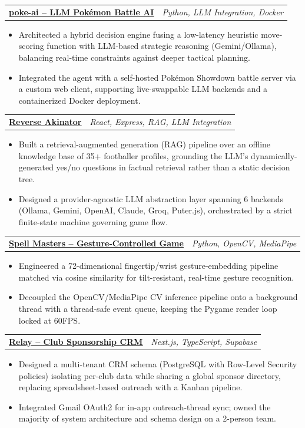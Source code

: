 \documentclass[letterpaper,11pt]{article}
\makeatletter
\newcommand{\resumeItem}[1]{
  \item\small{
    {#1 \vspace{-2pt}}
  }
}
\newcommand{\resumeProjectHeading}[2]{
    \item
    \begin{minipage}[t]{0.97\textwidth}
    \begin{tabular*}{\linewidth}{l@{\extracolsep{\fill}}r}
      \small#1 & #2 \\
    \end{tabular*}\vspace{-7pt}
}
\newcommand{\resumeItemListStart}{\begin{itemize}}
\newcommand{\resumeItemListEnd}{\end{itemize}\vspace{-5pt}\end{minipage}}
\makeatother
\begin{document}
      \resumeProjectHeading
          {\textbf{\href{https://github.com/micvitc/Club-Expo-AIvsChampions}{\underline{poke-ai -- LLM Pok\'emon Battle AI}}}}{\emph{Python, LLM Integration, Docker}}
          \resumeItemListStart
            \resumeItem{Architected a hybrid decision engine fusing a low-latency heuristic move-scoring function with LLM-based strategic reasoning (Gemini/Ollama), balancing real-time constraints against deeper tactical planning.}
            \resumeItem{Integrated the agent with a self-hosted Pok\'emon Showdown battle server via a custom web client, supporting live-swappable LLM backends and a containerized Docker deployment.}
          \resumeItemListEnd

      \resumeProjectHeading
          {\textbf{\href{https://github.com/Anasarfeen123/reverse-akinator}{\underline{Reverse Akinator}}}}{\emph{React, Express, RAG, LLM Integration}}
          \resumeItemListStart
            \resumeItem{Built a retrieval-augmented generation (RAG) pipeline over an offline knowledge base of 35+ footballer profiles, grounding the LLM's dynamically-generated yes/no questions in factual retrieval rather than a static decision tree.}
            \resumeItem{Designed a provider-agnostic LLM abstraction layer spanning 6 backends (Ollama, Gemini, OpenAI, Claude, Groq, Puter.js), orchestrated by a strict finite-state machine governing game flow.}
          \resumeItemListEnd

      \resumeProjectHeading
          {\textbf{\href{https://github.com/kumar-shaurya/MIC-Spell-Masters}{\underline{Spell Masters -- Gesture-Controlled Game}}}}{\emph{Python, OpenCV, MediaPipe}}
          \resumeItemListStart
            \resumeItem{Engineered a 72-dimensional fingertip/wrist gesture-embedding pipeline matched via cosine similarity for tilt-resistant, real-time gesture recognition.}
            \resumeItem{Decoupled the OpenCV/MediaPipe CV inference pipeline onto a background thread with a thread-safe event queue, keeping the Pygame render loop locked at 60FPS.}
          \resumeItemListEnd

      \resumeProjectHeading
          {\textbf{\href{https://github.com/ivan-george710/SPONSOR-HELP}{\underline{Relay -- Club Sponsorship CRM}}}}{\emph{Next.js, TypeScript, Supabase}}
          \resumeItemListStart
            \resumeItem{Designed a multi-tenant CRM schema (PostgreSQL with Row-Level Security policies) isolating per-club data while sharing a global sponsor directory, replacing spreadsheet-based outreach with a Kanban pipeline.}
            \resumeItem{Integrated Gmail OAuth2 for in-app outreach-thread sync; owned the majority of system architecture and schema design on a 2-person team.}
          \resumeItemListEnd
\end{document}
